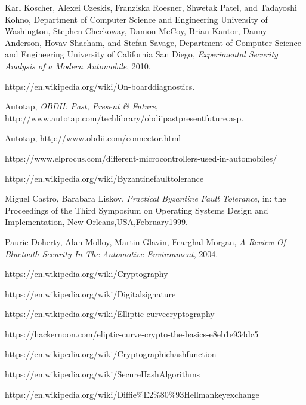 \documentclass[11pt]{article}
\begin{document}
\begin{thebibliography}{10}
	Karl Koscher, Alexei Czeskis, Franziska Roesner, Shwetak Patel, and Tadayoshi Kohno,
	Department of Computer Science and Engineering University of Washington, Stephen Checkoway, Damon McCoy, Brian Kantor, Danny Anderson, Hovav Shacham, and Stefan Savage, Department of Computer Science and Engineering University of California San Diego, \textit{Experimental Security Analysis of a Modern Automobile}, 2010.
	
	https://en.wikipedia.org/wiki/On-board\textunderscore diagnostics.
	
	Autotap, \textit{OBDII: Past, Present \& Future},
	http://www.autotap.com/techlibrary/obdii\textunderscore past\textunderscore present\textunderscore future.asp.
	
	Autotap, http://www.obdii.com/connector.html
	
	https://www.elprocus.com/different-microcontrollers-used-in-automobiles/
	
	https://en.wikipedia.org/wiki/Byzantine\textunderscore fault\textunderscore tolerance
	
	Miguel Castro, Barabara Liskov, \textit{Practical Byzantine Fault Tolerance}, in: the Proceedings of the Third Symposium on Operating Systems Design and Implementation, New Orleans,USA,February1999.
	
	Pauric Doherty, Alan Molloy, Martin Glavin, Fearghal Morgan,
	\textit{A Review Of Bluetooth Security In The Automotive Environment}, 2004.
	
	https://en.wikipedia.org/wiki/Cryptography
	
	https://en.wikipedia.org/wiki/Digital\textunderscore signature
	
	https://en.wikipedia.org/wiki/Elliptic-curve\textunderscore cryptography
	
	https://hackernoon.com/eliptic-curve-crypto-the-basics-e8eb1e934dc5
	
	https://en.wikipedia.org/wiki/Cryptographic\textunderscore hash\textunderscore function
	
	https://en.wikipedia.org/wiki/Secure\textunderscore Hash\textunderscore Algorithms
	
	https://en.wikipedia.org/wiki/Diffie\%E2\%80\%93Hellman\textunderscore key\textunderscore exchange
	

\end{thebibliography}
\end{document}
